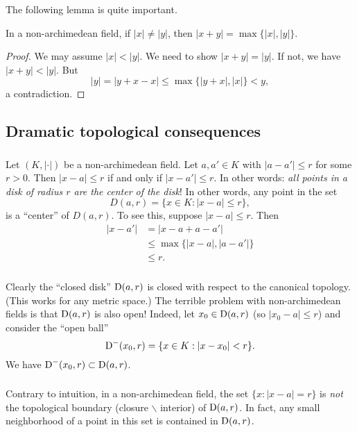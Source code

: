 The following lemma is quite important. 

\begin{lemma}
In a non-archimedean field, if $|x|\ne |y|$, then 
$|x+y|=\max\{|x|,|y|\}$. 
\end{lemma}
\begin{proof}
We may assume $|x|<|y|$. We need to show $|x+y|=|y|$. If not, we have 
$|x+y|<|y|$. But 
\[
  |y|=|y+x-x| \leqslant \max\{|y+x|,|x|\} < y ,
\]
a contradiction. 
\end{proof}





\subsection{Dramatic topological consequences}

\subsubsection{}
Let $(K,|\cdot|)$ be a non-archimedean field. Let $a,a'\in K$ with 
$|a-a'|\leqslant r$ for some $r>0$. Then $|x-a|\leqslant r$ if and only if 
$|x-a'|\leqslant r$. In other words: \emph{all points in a disk of radius $r$ 
are the center of the disk}! In other words, any point in the set  
\[
  D(a,r) = \{x\in K:|x-a|\leqslant r\} ,
\]
is a ``center'' of $D(a,r)$. To see this, suppose $|x-a|\leqslant r$. Then 
\begin{align*}
  |x-a'| 
    &= |x-a+a-a'| \\
    &\leqslant \max\{|x-a|,|a-a'|\} \\
    &\leqslant r .
\end{align*}

\subsubsection{}
Clearly the ``closed disk'' $\operatorname{D}(a,r)$ is closed with respect to the canonical 
topology. (This works for any metric space.) The terrible problem with 
non-archimedean fields is that $\operatorname{D}(a,r)$ is also open! Indeed, let 
$x_0\in \operatorname{D}(a,r)$ (so $|x_0-a|\leqslant r$) and consider the ``open ball'' 
\[
  \operatorname{D}^-(x_0,r) = \{x\in K:|x-x_0|<r\} .
\]
We have $\operatorname{D}^-(x_0,r)\subset \operatorname{D}(a,r)$. 

\subsubsection{}
Contrary to intuition, in a non-archimedean field, the set 
$\{x\colon |x-a|=r\}$ is \emph{not} the topological boundary (closure 
$\smallsetminus$ interior) of $\operatorname{D}(a,r)$. In fact, any small neighborhood of 
a point in this set is contained in $\operatorname{D}(a,r)$. 

